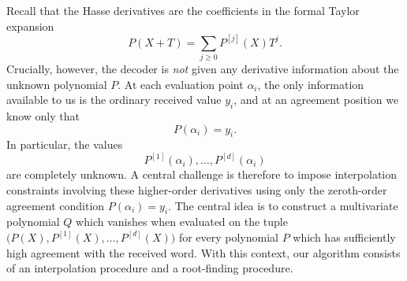 \documentclass[11pt]{article}
\begin{document}
Recall that the Hasse derivatives are the coefficients in the formal Taylor expansion
\[
P(X+T)=\sum_{j\geq 0}P^{[j]}(X)T^j.
\]
Crucially, however, the decoder is \emph{not} given any derivative information
about the unknown polynomial $P$. At each evaluation point $\alpha_i$, the
only information available to us is the ordinary received value $y_i$, and at
an agreement position we know only that
\[
    P(\alpha_i)=y_i.
\]
In particular, the values
\[
    P^{[1]}(\alpha_i),\ldots,P^{[d]}(\alpha_i)
\]
are completely unknown. A central challenge is therefore to impose
interpolation constraints involving these higher-order derivatives using only
the zeroth-order agreement condition $P(\alpha_i)=y_i$.
The central idea is to construct a multivariate polynomial $Q$ which vanishes when evaluated on the tuple $\bigl(P(X),P^{[1]}(X),\ldots,P^{[d]}(X)\bigr)$ for every polynomial $P$ which has sufficiently high agreement with the received word. With this context, our algorithm consists of an interpolation procedure and a root-finding procedure.
\end{document}
